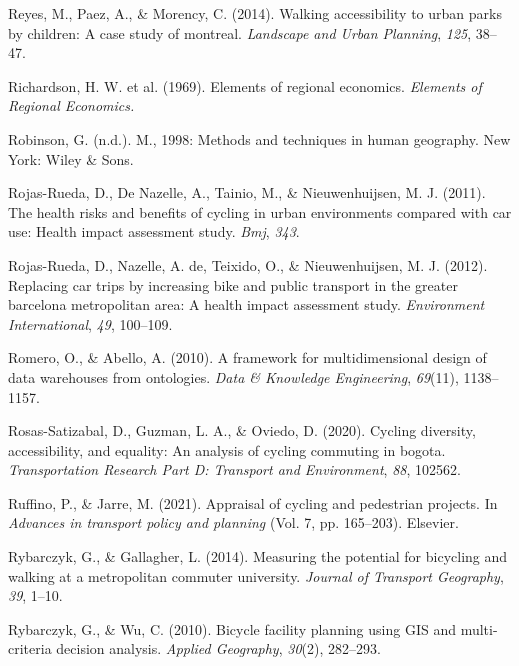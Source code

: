 \documentclass[12pt,twoside]{reedthesis}
\newlength{\cslhangindent}
\newenvironment{CSLReferences}[2] %
 {%
  \setlength{\parindent}{0pt}
  \ifodd #1 \everypar{\setlength{\hangindent}{\cslhangindent}}\ignorespaces\fi
  \ifnum #2 > 0
  \setlength{\parskip}{#2\baselineskip}
  \fi
 }%
 {}
\begin{document}
\begin{CSLReferences}{1}{0}
\leavevmode{}%
Reyes, M., Paez, A., \& Morency, C. (2014). Walking accessibility to urban parks by children: A case study of montreal. \emph{Landscape and Urban Planning}, \emph{125}, 38--47.

\leavevmode{}%
Richardson, H. W. et al. (1969). Elements of regional economics. \emph{Elements of Regional Economics.}

\leavevmode{}%
Robinson, G. (n.d.). M., 1998: Methods and techniques in human geography. New York: Wiley \& Sons.

\leavevmode{}%
Rojas-Rueda, D., De Nazelle, A., Tainio, M., \& Nieuwenhuijsen, M. J. (2011). The health risks and benefits of cycling in urban environments compared with car use: Health impact assessment study. \emph{Bmj}, \emph{343}.

\leavevmode{}%
Rojas-Rueda, D., Nazelle, A. de, Teixido, O., \& Nieuwenhuijsen, M. J. (2012). Replacing car trips by increasing bike and public transport in the greater barcelona metropolitan area: A health impact assessment study. \emph{Environment International}, \emph{49}, 100--109.

\leavevmode{}%
Romero, O., \& Abello, A. (2010). A framework for multidimensional design of data warehouses from ontologies. \emph{Data \& Knowledge Engineering}, \emph{69}(11), 1138--1157.

\leavevmode{}%
Rosas-Satizabal, D., Guzman, L. A., \& Oviedo, D. (2020). Cycling diversity, accessibility, and equality: An analysis of cycling commuting in bogota. \emph{Transportation Research Part D: Transport and Environment}, \emph{88}, 102562.

\leavevmode{}%
Ruffino, P., \& Jarre, M. (2021). Appraisal of cycling and pedestrian projects. In \emph{Advances in transport policy and planning} (Vol. 7, pp. 165--203). Elsevier.

\leavevmode{}%
Rybarczyk, G., \& Gallagher, L. (2014). Measuring the potential for bicycling and walking at a metropolitan commuter university. \emph{Journal of Transport Geography}, \emph{39}, 1--10.

\leavevmode{}%
Rybarczyk, G., \& Wu, C. (2010). Bicycle facility planning using GIS and multi-criteria decision analysis. \emph{Applied Geography}, \emph{30}(2), 282--293.


\end{CSLReferences}
\end{document}
